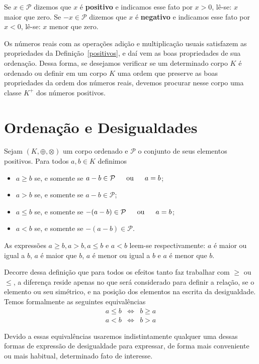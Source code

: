 \documentclass[glenn,refnum,codigo]{Estilo}
\begin{document}
Se $x\in \mathcal{P}$ dizemos que $x$ é \textbf{positivo} e indicamos esse fato
por $x>0$, lê-se: $x$ maior que zero.
Se $-x\in \mathcal{P}$ dizemos que $x$ é \textbf{negativo} e indicamos esse fato
por $x<0$, lê-se: $x$ menor que zero.

Os números reais com as operações adição e multiplicação usuais satisfazem as
propriedades da
Definição~\ref{positivos}, e daí vem as boas propriedades de sua ordenação.
Dessa forma, se desejamos
verificar se um determinado corpo $K$ é ordenado ou definir em um corpo $K$ uma
ordem que preserve as
boas propriedades da ordem dos números reais, devemos procurar nesse corpo uma
classe $K^+$ dos números
positivos.

\section{Ordenação e Desigualdades}

\begin{define}[desigualdades]
	Sejam $(K,\oplus,\otimes)$ um corpo ordenado e $\mathcal{P}$ o conjunto de seus
	elementos positivos. Para todos $a,b\in K$ definimos
	\begin{itemize}
		\item $a\geqslant b$ se, e somente se $a-b\in\mathcal{P} \ \ou\ a=b$;
		\item $a > b$ se, e somente se $a-b\in\mathcal{P}$;
		\item $a\leqslant b$ se, e somente se $-(a-b)\in\mathcal{P} \ \ou\ a=b$;
		\item $a<b$ se, e somente se $-(a-b)\in\mathcal{P}$.
	\end{itemize}
	As expressões $a\geqslant b, a > b, a\leqslant b$ e $a<b$ leem-se
	respectivamente: $a$ é maior ou igual a $b$,
	$a$ é maior que $b$, $a$ é menor ou igual a $b$ e $a$ é menor que $b$.
\end{define}

Decorre dessa definição que para todos os efeitos tanto faz trabalhar com
$\geqslant$ ou $\leqslant$,
a diferença reside apenas no que será considerado para definir a relação, se o
elemento ou seu simétrico, e
na posição dos elementos na escrita da desigualdade. Temos formalmente as
seguintes equivalências
\[
\begin{array}{rcl}
   a\leqslant b & \Longleftrightarrow & b\geqslant a\\
   a < b        & \Longleftrightarrow & b > a
\end{array}
\]

Devido a essas equivalências usaremos indistintamente qualquer uma dessas formas
de expressão
de desigualdade para expressar, de forma mais conveniente ou mais habitual,
determinado fato de interesse.
\end{document}

